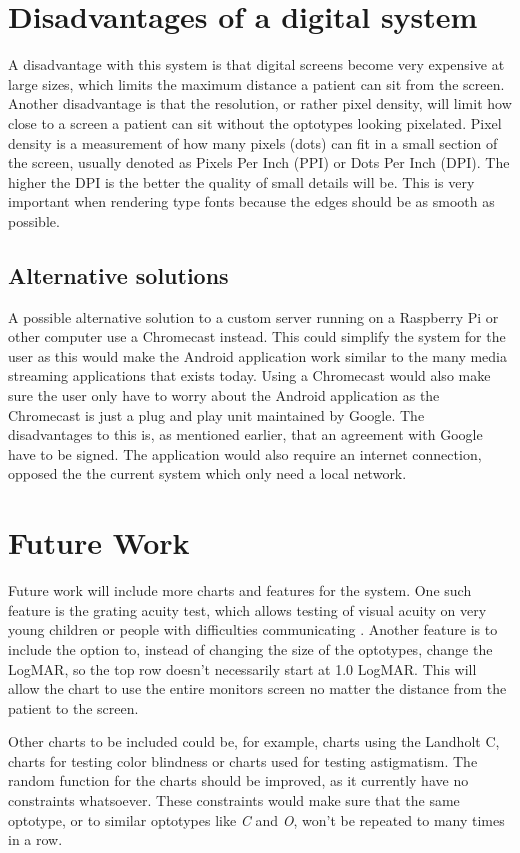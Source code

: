 \documentclass[12pt,a4paper,notitlepage]{report}
\begin{document}
\section{Disadvantages of a digital system}
A disadvantage with this system is that digital screens become very expensive at large sizes, which limits the maximum distance a patient can sit from the screen. Another disadvantage is that the resolution, or rather pixel density, will limit how close to a screen a patient can sit without the optotypes looking pixelated. Pixel density is a measurement of how many pixels (dots) can fit in a small section of the screen, usually denoted as Pixels Per Inch (PPI) or Dots Per Inch (DPI). The higher the DPI is the better the quality of small details will be. This is very important when rendering type fonts because the edges should be as smooth as possible.

\subsection{Alternative solutions}
A possible alternative solution to a custom server running on a Raspberry Pi or other computer use a Chromecast instead. This could simplify the system for the user as this would make the Android application work similar to the many media streaming applications that exists today. Using a Chromecast would also make sure the user only have to worry about the Android application as the Chromecast is just a plug and play unit maintained by Google. The disadvantages to this is, as mentioned earlier, that an agreement with Google have to be signed. The application would also require an internet connection, opposed the the current system which only need a local network.

\section{Future Work}
Future work will include more charts and features for the system. One such feature is the grating acuity test, which allows testing of visual acuity on very young children or people with difficulties communicating \cite{PGSoderbergOral}. Another feature is to include the option to, instead of changing the size of the optotypes, change the LogMAR, so the top row doesn't necessarily start at 1.0 LogMAR. This will allow the chart to use the entire monitors screen no matter the distance from the patient to the screen.

Other charts to be included could be, for example, charts using the Landholt C, charts for testing color blindness or charts used for testing astigmatism. The random function for the charts should be improved, as it currently have no constraints whatsoever. These constraints would make sure that the same optotype, or to similar optotypes like \textit{C} and \textit{O}, won't be repeated to many times in a row.
\end{document}
